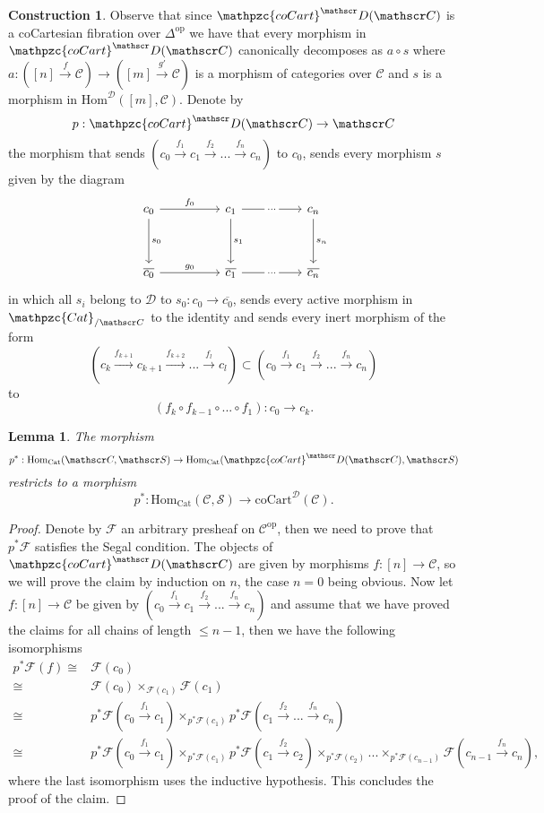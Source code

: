 \documentclass[a4paper, reqno]{amsart}
\newtheorem{lemma}[theorem]{Lemma}
\theoremstyle{definition}
\newtheorem{construction}[theorem]{Construction}
\newcommand\cC{\mathscr C}
\newcommand\cD{\mathscr D}
\newcommand\cF{\mathscr F}
\newcommand\cS{\mathscr S}
\newcommand\mor{\mathrm{Hom}}
\newcommand\op{\mathrm{op}}
\newcommand\cat{\mathrm{Cat}}
\newcommand\ccat{\mathpzc{Cat}}
\newcommand\cart{\mathrm{coCart}}
\newcommand\ccart{\mathpzc{coCart}}
\begin{document}
\begin{construction}
Observe that since $\ccart^\cD(\cC)$ is a coCartesian fibration over $\Delta^\op$ we have that every morphism in $\ccart^\cD(\cC)$ canonically decomposes as $a\circ s$ where $a:([n]\xrightarrow{f}\cC)\rightarrow ([m]\xrightarrow{g'}\cC)$ is a morphism of categories over $\cC$ and $s$ is a morphism in $\mor^\cD([m],\cC)$. Denote by  \[p:\ccart^\cD(\cC)\rightarrow\cC\]
the morphism that sends $(c_0\xrightarrow{f_1}c_1\xrightarrow{f_2}...\xrightarrow{f_n}c_n)$ to $c_0$, sends every morphism $s$ given by the diagram
\[
\begin{tikzcd}[row sep=huge,column sep=huge]
c_0\arrow[r, "f_0"]\arrow[d,  "s_0"]&c_1\arrow[r, "..." description]\arrow[d,  "s_{1}"]&c_n\arrow[d,  "s_n"]\\
\overline{c_0}\arrow[r, "g_0"]&\overline{c_1}\arrow[r, "..." description]&\overline{c_n}
\end{tikzcd}
\]
in which all $s_i$ belong to $\cD$ to $s_0:c_0\rightarrow\overline{c_0}$, sends every active morphism in $\ccat_{/\cC}$ to the identity and sends every inert morphism of the form
\[(c_k\xrightarrow{f_{k+1}}c_{k+1}\xrightarrow{f_{k+2}}...\xrightarrow{f_l}c_l)\subset(c_0\xrightarrow{f_1}c_1\xrightarrow{f_2}...\xrightarrow{f_n}c_n)\]
to \[(f_k\circ f_{k-1}\circ...\circ f_1):c_0\rightarrow c_k.\]
\end{construction}
\begin{lemma}\label{lem:fib_cart}
The morphism 
\[p^*:\mor_\cat(\cC,\cS)\rightarrow\mor_\cat(\ccart^\cD(\cC),\cS)\]
restricts to a morphism 
\[p^*:\mor_\cat(\cC,\cS)\rightarrow\cart^\cD(\cC).\]
\end{lemma}
\begin{proof}
Denote by $\cF$ an arbitrary presheaf on $\cC^\op$, then we need to prove that $p^*\cF$ satisfies the Segal condition. The objects of $\ccart^\cD(\cC)$ are given by morphisms $f:[n]\rightarrow\cC$, so we will prove the claim by induction on $n$, the case $n=0$ being obvious. Now let $f:[n]\rightarrow\cC$ be given by $(c_0\xrightarrow{f_1}c_1\xrightarrow{f_2}...\xrightarrow{f_n}c_n)$ and assume that we have proved the claims for all chains of length $\leq n-1$, then we have the following isomorphisms
\begin{align*}
    p^*\cF(f)\cong&\cF(c_0)\\
    \cong&\cF(c_0)\times_{\cF(c_1)}\cF(c_1)\\
    \cong& p^*\cF(c_0\xrightarrow{f_1}c_1)\times_{p^*\cF(c_1)}p^*\cF(c_1\xrightarrow{f_2}...\xrightarrow{f_n}c_n)\\
    \cong&p^*\cF(c_0\xrightarrow{f_1}c_1)\times_{p^*\cF(c_1)}p^*\cF(c_1\xrightarrow{f_2}c_2)\times_{p^*\cF(c_2)}...\times_{p^*\cF(c_{n-1})}\cF(c_{n-1}\xrightarrow{f_n}c_n),
\end{align*}
where the last isomorphism uses the inductive hypothesis. This concludes the proof of the claim.
\end{proof}
\end{document}
